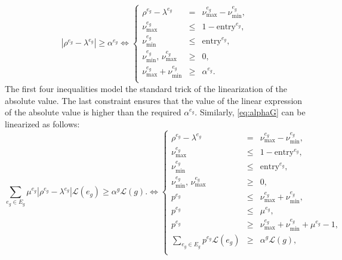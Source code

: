 \begin{equation}\label{eq:alpha-E}\tag{$\alpha$-E}
 |\rho^{e_g}-\lambda^{e_g}|\geq \alpha^{e_g} \Longleftrightarrow
 \left\{
 \begin{array}{ccl}
  \rho^{e_g} - \lambda^{e_g}                       & =    & \nu_\text{max}^{e_g} - \nu_\text{min}^{e_g},                                     \\
  \nu_\text{max}^{e_g}                         & \leq & 1-{\text{entry}^{e_g}},                                   \\
  \nu_\text{min}^{e_g}                      & \leq & {  \text{entry}^{e_g}},                                        \\
    \nu_\text{min}^{e_g}, \,\nu_\text{max}^{e_g} & \geq & 0, \\

  \nu_\text{max}^{e_g} + \nu_\text{min}^{e_g} & \geq & \alpha^{e_g}.
  \\
 \end{array}
 \right.
\end{equation}
The first four inequalities model the standard trick of the linearization of the absolute value. The last constraint ensures that the value of the linear expression of the absolute value is higher than the required  $\alpha^{e_g}$.
\noindent
Similarly, \eqref{eq:alphaG} can be linearized as follows:
\begin{equation}\label{eq:alpha-G}\tag{$\alpha$-G}
 \sum_{e_g\in E_g} \mu^{e_g}|\rho^{e_g}-\lambda^{e_g}|\mathcal L(e_g)\geq \alpha^g\mathcal L(g). \Longleftrightarrow
 \left\{
 \begin{array}{ccl}
  \rho^{e_g} - \lambda^{e_g}                       & =    & \nu_\text{max}^{e_g} - \nu_\text{min}^{e_g},                                     \\
  \nu_\text{max}^{e_g}                         & \leq & 1-{\text{entry}^{e_g}},                                   \\
  \nu_\text{min}^{e_g}                      & \leq & {  \text{entry}^{e_g}},                                        \\
  \nu_\text{min}^{e_g}, \,\nu_\text{max}^{e_g} & \geq & 0, \\
  p^{e_g} & \leq & \nu_\text{max}^{e_g} + \nu_\text{min}^{e_g}, \\
  p^{e_g} & \leq & \mu^{e_g}, \\
  p^{e_g} & \geq & \nu_\text{max}^{e_g} + \nu_\text{min}^{e_g} + \mu^{e_g} - 1, \\
  \sum_{e_g\in E_g} p^{e_g}\mathcal L(e_g) & \geq & \alpha^{g}\mathcal L(g),
  \\
 \end{array}
 \right.
\end{equation}
